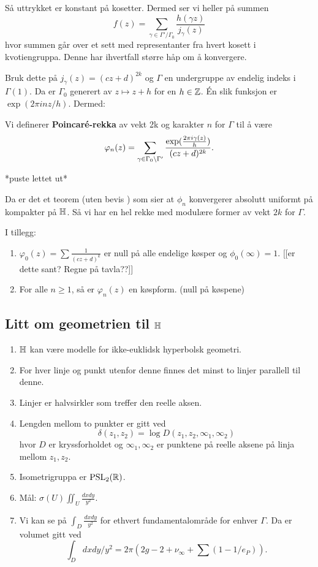 \documentclass[11pt, english]{article}
\begin{document}
Så uttrykket er konstant på kosetter. Dermed ser vi heller på summen
\[
f(z) = \sum_{\gamma \in \Gamma'/\Gamma_0} \frac{h(\gamma z)}{j_\gamma(z)}
\]
hvor summen går over et sett med representanter fra hvert kosett i kvotiengruppa. Denne har ihvertfall større håp om å konvergere.


Bruk dette på $j_\gamma(z) = (cz+d)^{2k}$ og $\Gamma$ en undergruppe av endelig indeks i $\Gamma(1)$. Da er $\Gamma_0$ generert av $z \mapsto z+h$ for en $ h \in \mathbb{Z}$. Én slik funksjon er $\exp(2 \pi i nz/h)$. Dermed:

\begin{defi}
Vi definerer \textbf{Poincaré-rekka} av vekt 2k og karakter $n$ for $\Gamma$ til å være 
\[
\varphi_n(z) = \sum_{\gamma \in \Gamma_0 \backslash \Gamma'} \frac{\exp(\frac{2 \pi i \gamma (z)}{h})}{(cz+d)^{2k}}.
\]
\end{defi}
*puste lettet ut*

Da er det et teorem (uten bevis  \smiley ) som sier at $\phi_n$ konvergerer absolutt uniformt på kompakter på $\mathbb{H}$. Så vi har en hel rekke med modulære former av vekt $2k$ for $\Gamma$. 

I tillegg:

\begin{enumerate}
\item $\varphi_0(z) = \sum \frac{1}{(cz+d)^k}$ er null på alle endelige køsper og $\phi_0(\infty)=1$. [[er dette sant? Regne på tavla??]]
\item For alle $n \geq 1$, så er $\varphi_n(z)$ en køspform. (null på køspene)
\end{enumerate}

\subsection{Litt om geometrien til $\mathbb{H}$ }

\begin{enumerate}
\item $\mathbb{H}$ kan være modelle for ikke-euklidsk hyperbolsk geometri.
\item For hver linje og punkt utenfor denne finnes det minst to linjer parallell til denne.
\item Linjer er halvsirkler som treffer den reelle aksen.
\item Lengden mellom to punkter er gitt ved 
\[
\delta(z_1,z_2) = \log D(z_1,z_2, \infty_1,\infty_2)
\]
hvor $D$ er kryssforholdet og $\infty_1,\infty_2$ er punktene på reelle aksene på linja mellom $z_1,z_2$.
\item Isometrigruppa er $\mathrm{PSL}_2(\mathbb{R})$.
\item Mål: $\sigma(U) \iint_U \frac{dx dy}{y^2}$. 
\item Vi kan se på $\int_D \frac{dx dy}{y^2}$ for ethvert fundamentalområde for enhver $\Gamma$. Da er volumet gitt ved
\[
\int_D dx dy/y^2 = 2 \pi (2g-2+\nu_\infty + \sum (1-1/e_P)).
\]
\end{enumerate}
\end{document}
